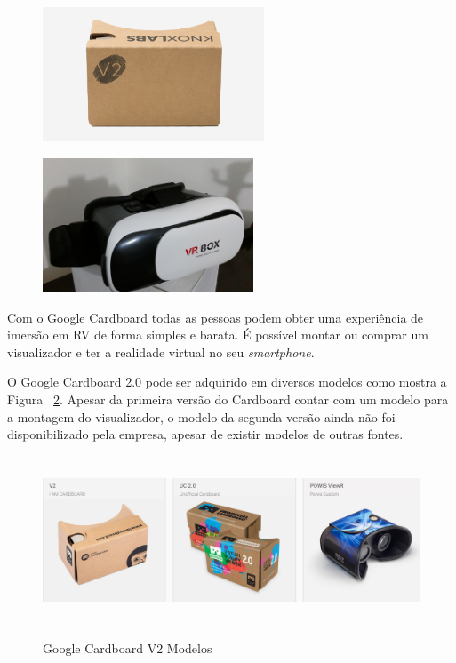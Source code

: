 \begin{figure}[H]
	
	\begin{minipage}{.5\textwidth}{
			\centering
			\includegraphics[height=4cm]{Imagens/googlecardboard.png}		
			\label{f.googlecardboard}	
		}
	\end{minipage}
	\begin{minipage}{.5\textwidth}{
			\centering
			\includegraphics[height=4cm]{Imagens/vrbox.jpg}		
			\label{f.vrbox}
		}
	\end{minipage}
	
\end{figure}

Com o Google Cardboard todas as pessoas podem obter uma experiência de imersão em RV de forma simples e barata. É possível montar ou comprar um visualizador e ter a realidade virtual no seu \textit{smartphone}. \cite{googlecardboard}

O Google Cardboard 2.0 pode ser adquirido em diversos modelos como mostra a Figura ~\ref{f.modelos}. Apesar da primeira versão do Cardboard contar com um modelo para a montagem do visualizador, o modelo da segunda versão ainda não foi disponibilizado pela empresa, apesar de existir modelos de outras fontes.

\begin{figure}[H]
	\caption{\small Google Cardboard V2 Modelos}
	\centering
	\includegraphics[height=5cm]{Imagens/modelos.png}
	\label{f.modelos}
\end{figure}

